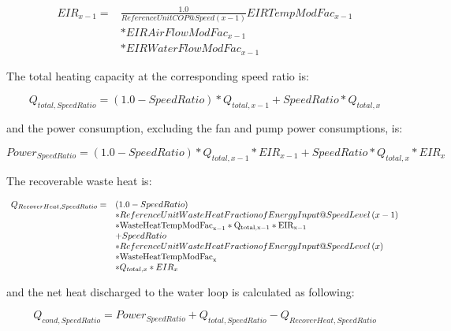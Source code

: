\begin{equation}
  \begin{array}{rl}
    EIR_{x - 1} =& \frac{{1.0}}{{ReferenceUnitCOP@Speed(x - 1)}}EIRTempModFac_{x - 1} \\
                &* EIRAirFlowModFac_{x - 1} \\
                &* EIRWaterFlowModFac_{x - 1}
  \end{array}
\end{equation}

The total heating capacity at the corresponding speed ratio is:

\begin{equation}
{Q_{total,SpeedRatio}} = \left( {1.0 - SpeedRatio} \right)*{Q_{total,x - 1}} + SpeedRatio*{Q_{total,x}}
\end{equation}

and the power consumption, excluding the fan and pump power consumptions, is:

\begin{equation}
Powe{r_{SpeedRatio}} = \left( {1.0 - SpeedRatio} \right)*{Q_{total,x - 1}}*EI{R_{x - 1}} + SpeedRatio*{Q_{total,x}}*EI{R_x}
\end{equation}

The recoverable waste heat is:

\begin{equation}
  \begin{array}{rl}
    Q_{RecoverHeat,SpeedRatio} =& \left( {1.0 - SpeedRatio} \right) \\
                               &* ReferenceUnitWasteHeatFractionofEnergyInput@SpeedLevel\left( {x - 1} \right) \\
                               &* \rm{WasteHeatTempModFac}_{x - 1} * {Q_{total,x - 1}} * EIR_{x - 1} \\
                               &+ SpeedRatio \\
                               &* ReferenceUnitWasteHeatFractionofEnergyInput@SpeedLevel\left( x \right) \\
                               &* \rm{WasteHeatTempModFac}_x \\
                               &* Q_{total,x} * EIR_x
  \end{array}
\end{equation}

and the net heat discharged to the water loop is calculated as following:

\begin{equation}
{Q_{cond,SpeedRatio}} = Powe{r_{SpeedRatio}} + {Q_{total,SpeedRatio}} - {Q_{RecoverHeat,SpeedRatio}}
\end{equation}

